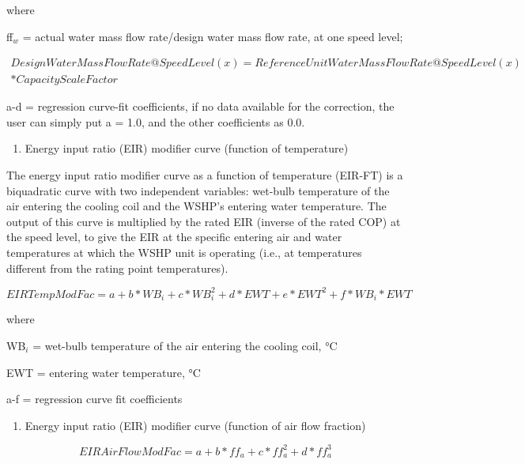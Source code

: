 where

ff\(_{w}\) = actual water mass flow rate/design water mass flow rate, at one speed level;

\begin{equation}
\begin{split}
  DesignWaterMassFlowRate@SpeedLevel(x) = ReferenceUnitWaterMassFlowRate@SpeedLevel(x) \\
  * CapacityScaleFactor
\end{split}
\end{equation}

a-d = regression curve-fit coefficients, if no data available for the correction, the user can simply put a = 1.0, and the other coefficients as 0.0.

\begin{enumerate}
\def\labelenumi{\arabic{enumi})}
\setcounter{enumi}{3}
\tightlist
\item
  Energy input ratio (EIR) modifier curve (function of temperature)
\end{enumerate}

The energy input ratio modifier curve as a function of temperature (EIR-FT) is a biquadratic curve with two independent variables: wet-bulb temperature of the air entering the cooling coil and the WSHP's entering water temperature. The output of this curve is multiplied by the rated EIR (inverse of the rated COP) at the speed level, to give the EIR at the specific entering air and water temperatures at which the WSHP unit is operating (i.e., at temperatures different from the rating point temperatures).

\begin{equation}
EIRTempModFac = a + b*W{B_i} + c*WB_i^2 + d*EWT + e*EW{T^2} + f*W{B_i}*EWT
\end{equation}

where

WB\(_{i}\) = wet-bulb temperature of the air entering the cooling coil, °C

EWT = entering water temperature, °C

a-f = regression curve fit coefficients

\begin{enumerate}
\def\labelenumi{\arabic{enumi})}
\setcounter{enumi}{4}
\tightlist
\item
  Energy input ratio (EIR) modifier curve (function of air flow fraction)
\end{enumerate}

\begin{equation}
EIRAirFlowModFac = a + b*f{f_a} + c*ff_a^2 + d*ff_a^3
\end{equation}

